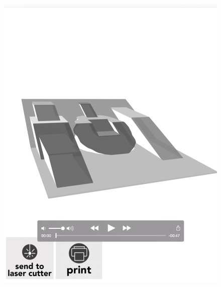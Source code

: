 \begin{figure}[htbp]
\centering
\includegraphics{figures/92_Appendix_Visual_Aids_Materials/video_card3.png}
\caption{}
\end{figure}

